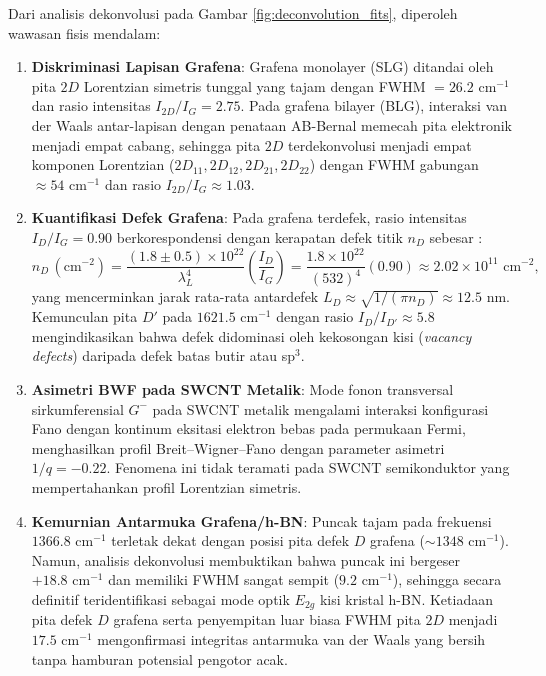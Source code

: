 Dari analisis dekonvolusi pada Gambar \ref{fig:deconvolution_fits}, diperoleh wawasan fisis mendalam:
\begin{enumerate}
    \item \textbf{Diskriminasi Lapisan Grafena}: Grafena monolayer (SLG) ditandai oleh pita $2D$ Lorentzian simetris tunggal yang tajam dengan FWHM $= 26.2\text{ cm}^{-1}$ dan rasio intensitas $I_{2D}/I_G = 2.75$. Pada grafena bilayer (BLG), interaksi van der Waals antar-lapisan dengan penataan AB-Bernal memecah pita elektronik menjadi empat cabang, sehingga pita $2D$ terdekonvolusi menjadi empat komponen Lorentzian ($2D_{11}, 2D_{12}, 2D_{21}, 2D_{22}$) dengan FWHM gabungan $\approx 54\text{ cm}^{-1}$ dan rasio $I_{2D}/I_G \approx 1.03$.
    \item \textbf{Kuantifikasi Defek Grafena}: Pada grafena terdefek, rasio intensitas $I_D/I_G = 0.90$ berkorespondensi dengan kerapatan defek titik $n_D$ sebesar \cite{cancado2011quantifying}:
    \begin{equation}
    n_D \, (\text{cm}^{-2}) = \frac{(1.8 \pm 0.5) \times 10^{22}}{\lambda_L^4} \left( \frac{I_D}{I_G} \right) = \frac{1.8 \times 10^{22}}{(532)^4} (0.90) \approx 2.02 \times 10^{11}\text{ cm}^{-2},
    \label{eq:densitas_defek}
    \end{equation}
    yang mencerminkan jarak rata-rata antardefek $L_D \approx \sqrt{1/(\pi n_D)} \approx 12.5\text{ nm}$. Kemunculan pita $D'$ pada $1621.5\text{ cm}^{-1}$ dengan rasio $I_D/I_{D'} \approx 5.8$ mengindikasikan bahwa defek didominasi oleh kekosongan kisi (\textit{vacancy defects}) daripada defek batas butir atau sp$^3$.
    \item \textbf{Asimetri BWF pada SWCNT Metalik}: Mode fonon transversal sirkumferensial $G^-$ pada SWCNT metalik mengalami interaksi konfigurasi Fano dengan kontinum eksitasi elektron bebas pada permukaan Fermi, menghasilkan profil Breit--Wigner--Fano dengan parameter asimetri $1/q = -0.22$. Fenomena ini tidak teramati pada SWCNT semikonduktor yang mempertahankan profil Lorentzian simetris.
    \item \textbf{Kemurnian Antarmuka Grafena/h-BN}: Puncak tajam pada frekuensi $1366.8\text{ cm}^{-1}$ terletak dekat dengan posisi pita defek $D$ grafena ($\sim 1348\text{ cm}^{-1}$). Namun, analisis dekonvolusi membuktikan bahwa puncak ini bergeser $+18.8\text{ cm}^{-1}$ dan memiliki FWHM sangat sempit ($9.2\text{ cm}^{-1}$), sehingga secara definitif teridentifikasi sebagai mode optik $E_{2g}$ kisi kristal h-BN. Ketiadaan pita defek $D$ grafena serta penyempitan luar biasa FWHM pita $2D$ menjadi $17.5\text{ cm}^{-1}$ mengonfirmasi integritas antarmuka van der Waals yang bersih tanpa hamburan potensial pengotor acak.
\end{enumerate}

